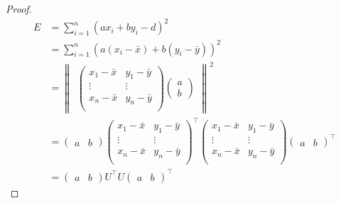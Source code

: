 \documentclass[letterpaper, 11pt]{article}
\begin{document}
\begin{proof}
    \begin{align*}
        E & = \sum_{i=1}^{n} (ax_i+by_i-d)^2                  \\
          & =\sum_{i=1}^{n} (a(x_i-\bar{x})+b(y_i-\bar{y}))^2 \\
          & =
        \begin{Vmatrix}
            \begin{pmatrix}
                x_1-\bar{x} & y_1-\bar{y} \\
                \vdots      & \vdots      \\
                x_n-\bar{x} & y_n-\bar{y} \\
            \end{pmatrix}
            \begin{pmatrix}
                a \\
                b
            \end{pmatrix}
        \end{Vmatrix}^2                              \\
          & =
        \begin{pmatrix}
            a & b
        \end{pmatrix}
        \begin{pmatrix}
            x_1-\bar{x} & y_1-\bar{y} \\
            \vdots      & \vdots      \\
            x_n-\bar{x} & y_n-\bar{y} \\
        \end{pmatrix}^\top
        \begin{pmatrix}
            x_1-\bar{x} & y_1-\bar{y} \\
            \vdots      & \vdots      \\
            x_n-\bar{x} & y_n-\bar{y} \\
        \end{pmatrix}
        \begin{pmatrix}
            a & b
        \end{pmatrix}^\top                                    \\
          & =
        \begin{pmatrix}
            a & b
        \end{pmatrix}
        U^\top U
        \begin{pmatrix}
            a & b
        \end{pmatrix}^\top
    \end{align*}
\end{proof}
\end{document}
